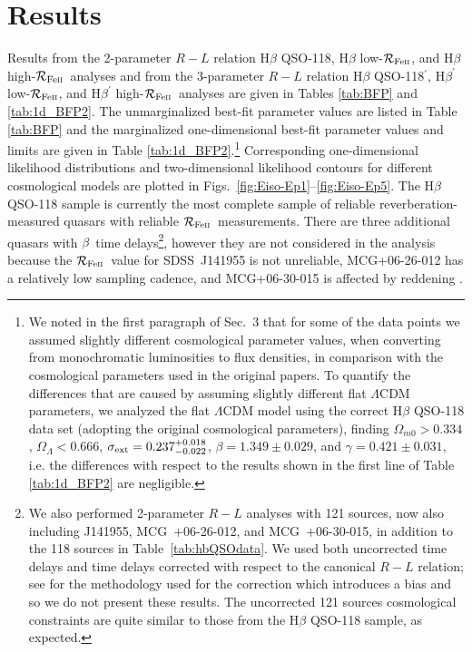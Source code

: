 \documentclass[a4paper,fleqn,usenatbib]{mnras}
\newcommand{\rfe}{${\cal R}_{\rm{Fe\textsc{ii}}}$}
\newcommand{\hb}{{\sc{H}}$\beta$\/}
\begin{document}
\section{Results}
\label{sec:QSO}


Results from the 2-parameter $R-L$ relation H$\beta$ QSO-118, H$\beta$ low-\rfe, and H$\beta$ high-\rfe\ analyses and from the 3-parameter $R-L$ relation H$\beta$ QSO-118$^\prime$, H$\beta^\prime$ low-\rfe, and H$\beta^\prime$ high-\rfe\ analyses are given in Tables \ref{tab:BFP} and \ref{tab:1d_BFP2}. The unmarginalized best-fit parameter values are listed in Table \ref{tab:BFP} and the marginalized one-dimensional best-fit parameter values and limits are given in Table \ref{tab:1d_BFP2}.\footnote{We noted in the first paragraph of Sec.\ 3 that for some of the data points we assumed slightly different cosmological parameter values, when converting from monochromatic luminosities to flux densities, in comparison with the cosmological parameters used in the original papers. To quantify the differences that are caused by assuming slightly different flat $\Lambda$CDM parameters, we analyzed the flat $\Lambda$CDM model using the correct H$\beta$ QSO-118 data set (adopting the original cosmological parameters), finding $\Omega_{m0} > 0.334$, $\Omega_{\Lambda} < 0.666$, $\sigma_{\rm ext} = 0.237^{+0.018}_{-0.022}$, $\beta = 1.349 \pm 0.029$, and $\gamma = 0.421 \pm 0.031$, i.e. the differences with respect to the results shown in the first line of Table \ref{tab:1d_BFP2} are negligible.} Corresponding one-dimensional likelihood distributions and two-dimensional likelihood contours for different cosmological models are plotted in Figs.\ \ref{fig:Eiso-Ep1}--\ref{fig:Eiso-Ep5}. The H$\beta$ QSO-118 sample is currently the most complete sample of reliable reverberation-measured quasars with reliable \rfe\ measurements. There are three additional quasars with \hb\ time delays\footnote{We also performed 2-parameter $R-L$ analyses with 121 sources, now also including J141955, MCG~+06-26-012, and MCG~+06-30-015, in addition to the 118 sources in Table~\ref{tab:hbQSOdata}. We used both uncorrected time delays and time delays corrected with respect to the canonical $R-L$ relation; see \citet{Mary2019} for the methodology used for the correction which introduces a bias and so we do not present these results. The uncorrected 121 sources cosmological constraints are quite similar to those from the
H$\beta$ QSO-118 sample, as expected.}, however they are not considered in the analysis because the \rfe\ value for SDSS~J141955 is not unreliable, MCG+06-26-012 has a relatively low sampling cadence, and MCG+06-30-015 is affected by reddening \citep{duwang_2019}.
\end{document}
